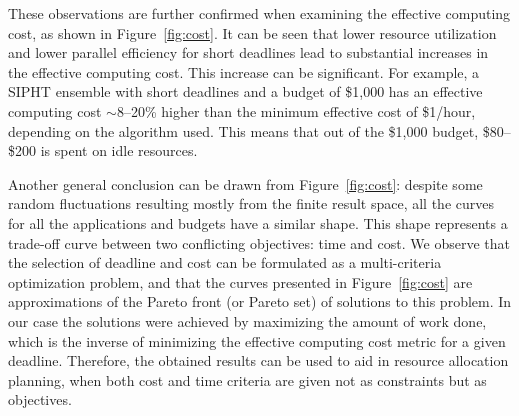 \documentclass{sig-alternate}
\begin{document}
These observations are further confirmed when examining the effective computing
cost, as shown in Figure~\ref{fig:cost}. It can be seen that lower resource
utilization and lower parallel efficiency for short deadlines lead to
substantial increases in the effective computing cost. This increase can be 
significant. For example, a SIPHT ensemble with short deadlines and a budget
of \$1,000 has an effective computing cost $\sim$8--20\% higher than the 
minimum effective cost of \$1/hour, depending on the algorithm used. This means 
that out of the \$1,000 budget, \$80--\$200 is spent on idle resources.

Another general conclusion can be drawn from Figure~\ref{fig:cost}: despite some
random fluctuations resulting mostly from the finite result space, all the
curves for all the applications and budgets have a similar shape. This shape
represents a trade-off curve between two conflicting objectives: time and cost.
We observe that the selection of deadline and cost can be formulated as a
multi-criteria optimization problem, and that the curves presented in 
Figure~\ref{fig:cost} are approximations of the Pareto front (or Pareto set) of
solutions to this problem. In our case the solutions were achieved by maximizing
the amount of work done, which is the inverse of minimizing the effective 
computing cost metric for a given deadline. Therefore, the obtained results 
can be used to aid in resource allocation planning, when both cost and time 
criteria are given not as constraints but as objectives.

\end{document}
